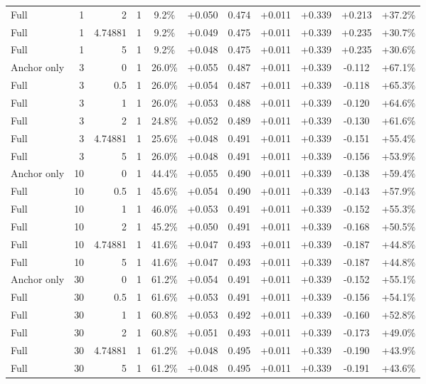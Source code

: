 \begin{table}[htbp]
\begin{tabular}{lrrrccccccc}
Full & 1 & 2 & 1 & 9.2\% & +0.050 & 0.474 & +0.011 & +0.339 & +0.213 & +37.2\% \\
Full & 1 & 4.74881 & 1 & 9.2\% & +0.049 & 0.475 & +0.011 & +0.339 & +0.235 & +30.7\% \\
Full & 1 & 5 & 1 & 9.2\% & +0.048 & 0.475 & +0.011 & +0.339 & +0.235 & +30.6\% \\
Anchor only & 3 & 0 & 1 & 26.0\% & +0.055 & 0.487 & +0.011 & +0.339 & -0.112 & +67.1\% \\
Full & 3 & 0.5 & 1 & 26.0\% & +0.054 & 0.487 & +0.011 & +0.339 & -0.118 & +65.3\% \\
Full & 3 & 1 & 1 & 26.0\% & +0.053 & 0.488 & +0.011 & +0.339 & -0.120 & +64.6\% \\
Full & 3 & 2 & 1 & 24.8\% & +0.052 & 0.489 & +0.011 & +0.339 & -0.130 & +61.6\% \\
Full & 3 & 4.74881 & 1 & 25.6\% & +0.048 & 0.491 & +0.011 & +0.339 & -0.151 & +55.4\% \\
Full & 3 & 5 & 1 & 26.0\% & +0.048 & 0.491 & +0.011 & +0.339 & -0.156 & +53.9\% \\
Anchor only & 10 & 0 & 1 & 44.4\% & +0.055 & 0.490 & +0.011 & +0.339 & -0.138 & +59.4\% \\
Full & 10 & 0.5 & 1 & 45.6\% & +0.054 & 0.490 & +0.011 & +0.339 & -0.143 & +57.9\% \\
Full & 10 & 1 & 1 & 46.0\% & +0.053 & 0.491 & +0.011 & +0.339 & -0.152 & +55.3\% \\
Full & 10 & 2 & 1 & 45.2\% & +0.050 & 0.491 & +0.011 & +0.339 & -0.168 & +50.5\% \\
Full & 10 & 4.74881 & 1 & 41.6\% & +0.047 & 0.493 & +0.011 & +0.339 & -0.187 & +44.8\% \\
Full & 10 & 5 & 1 & 41.6\% & +0.047 & 0.493 & +0.011 & +0.339 & -0.187 & +44.8\% \\
Anchor only & 30 & 0 & 1 & 61.2\% & +0.054 & 0.491 & +0.011 & +0.339 & -0.152 & +55.1\% \\
Full & 30 & 0.5 & 1 & 61.6\% & +0.053 & 0.491 & +0.011 & +0.339 & -0.156 & +54.1\% \\
Full & 30 & 1 & 1 & 60.8\% & +0.053 & 0.492 & +0.011 & +0.339 & -0.160 & +52.8\% \\
Full & 30 & 2 & 1 & 60.8\% & +0.051 & 0.493 & +0.011 & +0.339 & -0.173 & +49.0\% \\
Full & 30 & 4.74881 & 1 & 61.2\% & +0.048 & 0.495 & +0.011 & +0.339 & -0.190 & +43.9\% \\
Full & 30 & 5 & 1 & 61.2\% & +0.048 & 0.495 & +0.011 & +0.339 & -0.191 & +43.6\% \\

\end{tabular}
\end{table}
